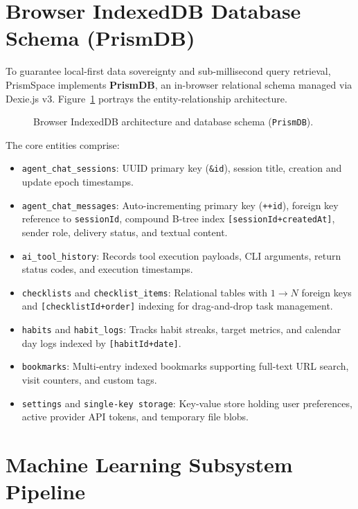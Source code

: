 \documentclass[12pt,a4paper]{report}
\begin{document}
\section{Browser IndexedDB Database Schema (PrismDB)}
To guarantee local-first data sovereignty and sub-millisecond query retrieval, PrismSpace implements \textbf{PrismDB}, an in-browser relational schema managed via Dexie.js v3. Figure~\ref{fig:db_schema} portrays the entity-relationship architecture.

\begin{figure}[H]
    \centering
    \caption{Browser IndexedDB architecture and database schema (\texttt{PrismDB}).}
    \label{fig:db_schema}
\end{figure}

The core entities comprise:
\begin{itemize}
    \item \texttt{agent\_chat\_sessions}: UUID primary key (\texttt{\&id}), session title, creation and update epoch timestamps.
    \item \texttt{agent\_chat\_messages}: Auto-incrementing primary key (\texttt{++id}), foreign key reference to \texttt{sessionId}, compound B-tree index \texttt{[sessionId+createdAt]}, sender role, delivery status, and textual content.
    \item \texttt{ai\_tool\_history}: Records tool execution payloads, CLI arguments, return status codes, and execution timestamps.
    \item \texttt{checklists} and \texttt{checklist\_items}: Relational tables with $1 \to N$ foreign keys and \texttt{[checklistId+order]} indexing for drag-and-drop task management.
    \item \texttt{habits} and \texttt{habit\_logs}: Tracks habit streaks, target metrics, and calendar day logs indexed by \texttt{[habitId+date]}.
    \item \texttt{bookmarks}: Multi-entry indexed bookmarks supporting full-text URL search, visit counters, and custom tags.
    \item \texttt{settings} and \texttt{single-key storage}: Key-value store holding user preferences, active provider API tokens, and temporary file blobs.
\end{itemize}

\section{Machine Learning Subsystem Pipeline}
\end{document}
